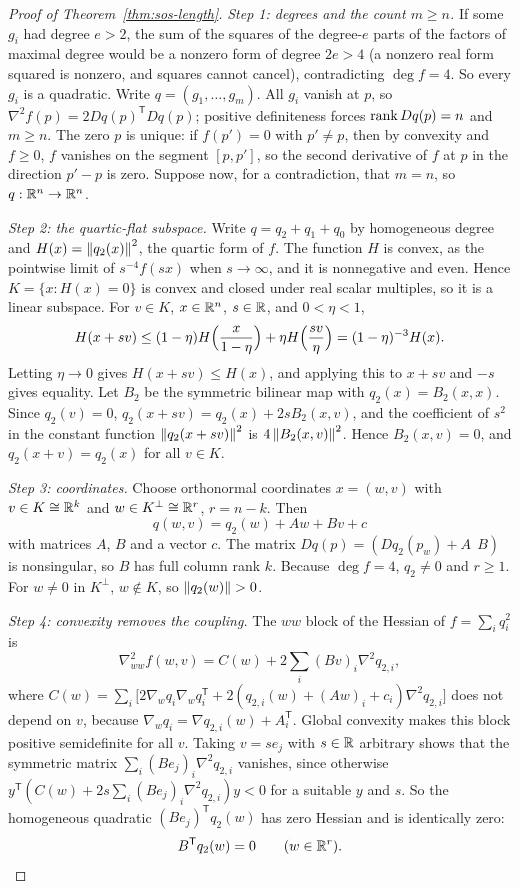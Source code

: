 \begin{proof}[Proof of Theorem~\ref{thm:sos-length}]
\emph{Step 1: degrees and the count $m\ge n$.} If some $g_i$ had degree
$e>2$, the sum of the squares of the degree-$e$ parts of the factors of
maximal degree would be a nonzero form of degree $2e>4$ (a nonzero real form
squared is nonzero, and squares cannot cancel), contradicting $\deg f=4$. So
every $g_i$ is a quadratic. Write $q=(g_1,\ldots,g_m)$. All $g_i$ vanish at
$p$, so $\nabla^2f(p)=2Dq(p)^{\mathsf T}Dq(p)$; positive definiteness forces
$\operatorname{rank} Dq(p)=n$ and $m\ge n$. The zero $p$ is unique: if $f(p')=0$ with
$p'\ne p$, then by convexity and $f\ge0$, $f$ vanishes on the segment
$[p,p']$, so the second derivative of $f$ at $p$ in the direction $p'-p$ is
zero. Suppose now, for a contradiction, that $m=n$, so $q:\mathbb R^n\to\mathbb R^n$.

\emph{Step 2: the quartic-flat subspace.} Write $q=q_2+q_1+q_0$ by
homogeneous degree and $H(x)=\left\lVert q_2(x)\right\rVert^2$, the quartic form of $f$. The
function $H$ is convex, as the pointwise limit of $s^{-4}f(sx)$ when
$s\to\infty$, and it is nonnegative and even. Hence
$K=\{x:H(x)=0\}$ is convex and closed under real scalar multiples, so it is a
linear subspace. For $v\in K$, $x\in\mathbb R^n$, $s\in\mathbb R$, and $0<\eta<1$,
\[
 H(x+sv)\le(1-\eta)H\Bigl(\frac x{1-\eta}\Bigr)+\eta H\Bigl(\frac{sv}\eta\Bigr)
 =(1-\eta)^{-3}H(x).
\]
Letting $\eta\to0$ gives $H(x+sv)\le H(x)$, and applying this to $x+sv$ and
$-s$ gives equality. Let $B_2$ be the symmetric bilinear map with
$q_2(x)=B_2(x,x)$. Since $q_2(v)=0$, $q_2(x+sv)=q_2(x)+2sB_2(x,v)$, and the
coefficient of $s^2$ in the constant function $\left\lVert q_2(x+sv)\right\rVert^2$ is
$4\left\lVert B_2(x,v)\right\rVert^2$. Hence $B_2(x,v)=0$, and $q_2(x+v)=q_2(x)$ for all
$v\in K$.

\emph{Step 3: coordinates.} Choose orthonormal coordinates $x=(w,v)$ with
$v\in K\cong\mathbb R^k$ and $w\in K^\perp\cong\mathbb R^{r}$, $r=n-k$. Then
\[
 q(w,v)=q_2(w)+Aw+Bv+c
\]
with matrices $A$, $B$ and a vector $c$. The matrix $Dq(p)=(Dq_2(p_w)+A\ \ B)$
is nonsingular, so $B$ has full column rank $k$. Because $\deg f=4$,
$q_2\ne0$ and $r\ge1$. For $w\ne0$ in $K^\perp$, $w\notin K$, so
$\left\lVert q_2(w)\right\rVert>0$.

\emph{Step 4: convexity removes the coupling.} The $ww$ block of the Hessian
of $f=\sum_iq_i^2$ is
\[
 \nabla^2_{ww}f(w,v)=C(w)+2\sum_i(Bv)_i\nabla^2q_{2,i},
\]
where $C(w)=\sum_i\bigl[2\nabla_wq_i\nabla_wq_i^{\mathsf
T}+2(q_{2,i}(w)+(Aw)_i+c_i)\nabla^2q_{2,i}\bigr]$ does not depend on $v$,
because $\nabla_wq_i=\nabla q_{2,i}(w)+A_i^{\mathsf T}$. Global convexity
makes this block positive semidefinite for all $v$. Taking $v=se_j$ with
$s\in\mathbb R$ arbitrary shows that the symmetric matrix
$\sum_i(Be_j)_i\nabla^2q_{2,i}$ vanishes, since otherwise
$y^{\mathsf T}(C(w)+2s\sum_i(Be_j)_i\nabla^2q_{2,i})y<0$ for a suitable $y$
and $s$. So the homogeneous quadratic $(Be_j)^{\mathsf T}q_2(w)$ has zero
Hessian and is identically zero:
\begin{equation}
 B^{\mathsf T}q_2(w)=0\qquad(w\in\mathbb R^r).
 \label{eq:algebraic-length-coupling}
\end{equation}


\end{proof}
